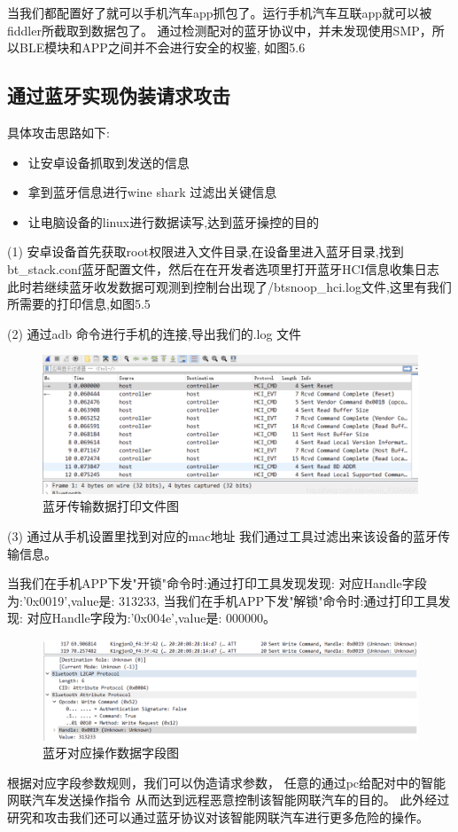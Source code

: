 当我们都配置好了就可以手机汽车app抓包了。运行手机汽车互联app就可以被fiddler所截取到数据包了。
通过检测配对的蓝牙协议中，并未发现使用SMP，所以BLE模块和APP之间并不会进行安全的权鉴, 如图5.6
\newline
\subsection{通过蓝牙实现伪装请求攻击}
具体攻击思路如下\cite{von2021method}:
\begin{itemize}
    \item 让安卓设备抓取到发送的信息
    \item 拿到蓝牙信息进行wine shark 过滤出关键信息
    \item 让电脑设备的linux进行数据读写,达到蓝牙操控的目的
\end{itemize}

(1) 安卓设备首先获取root权限进入文件目录,在设备里进入蓝牙目录,找到bt\_stack.conf蓝牙配置文件，然后在在开发者选项里打开蓝牙HCI信息收集日志
此时若继续蓝牙收发数据可观测到控制台出现了/btsnoop\_hci.log文件,这里有我们所需要的打印信息,如图5.5

(2) 通过adb 命令进行手机的连接,导出我们的.log 文件
\begin{figure}
    \centering
    \includegraphics[scale=0.5]{resources/img/i17.png}
    \caption{蓝牙传输数据打印文件图}
  \end{figure}
(3) 通过从手机设置里找到对应的mac地址 我们通过工具过滤出来该设备的蓝牙传输信息。
  
当我们在手机APP下发"开锁"命令时:通过打印工具发现发现:
对应Handle字段为:'0x0019',value是: 313233,
当我们在手机APP下发"解锁"命令时:通过打印工具发现:
对应Handle字段为:'0x004e',value是: 000000。
\begin{figure}
    \centering
    \includegraphics[scale=0.5]{resources/img/i18.png}
    \caption{蓝牙对应操作数据字段图}
  \end{figure}
根据对应字段参数规则，我们可以伪造请求参数\cite{lu2005conditional}，
任意的通过pc给配对中的智能网联汽车发送操作指令
从而达到远程恶意控制该智能网联汽车的目的。
此外经过研究和攻击我们还可以通过蓝牙协议对该智能网联汽车进行更多危险的操作。

